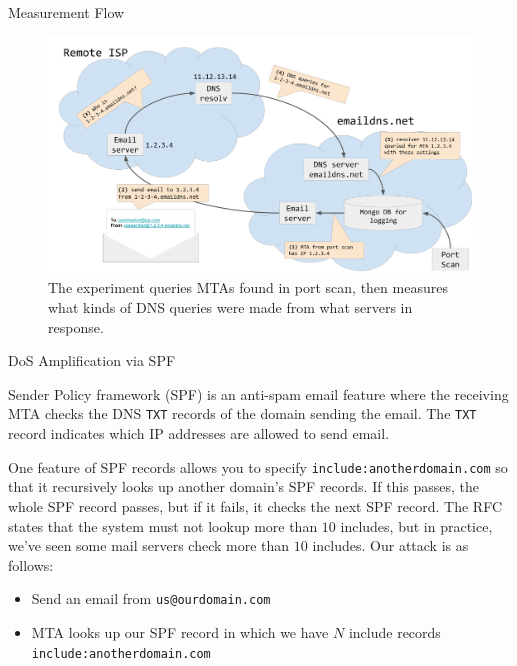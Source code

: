 \documentclass[final]{beamer}
\newlength{\onecolwid}
\newlength{\twocolwid}
\begin{document}
\begin{frame}[t]
\begin{columns}[t]
\begin{column}{\twocolwid}
\begin{columns}[t,totalwidth=\twocolwid]
\begin{column}{\onecolwid}
\begin{block}{Measurement Flow}
\begin{figure}[experiment]
  \centering
  \includegraphics[width=\onecolwid]{experiment_flow}
  \caption{The experiment queries MTAs found in port scan, then measures what kinds of DNS queries were made from what servers in response.}
\end{figure}

\end{block}


\begin{block}{DoS Amplification via SPF}


Sender Policy framework (SPF) is an anti-spam email feature where the receiving MTA checks the DNS {\tt TXT} records of the domain sending the email. The {\tt TXT} record indicates which IP addresses are allowed to send email. 

One feature of SPF records allows you to specify {\tt include:anotherdomain.com} so that it recursively looks up another domain's SPF records. If this passes, the whole SPF record passes, but if it fails, it checks the next SPF record. The RFC states that the system must not lookup more than $10$ includes, but in practice, we've seen some mail servers check more than $10$ includes. Our attack is as follows:
\begin{itemize}
\item Send an email from {\tt us@ourdomain.com}
\item MTA looks up our SPF record in which we have $N$ include records {\tt include:anotherdomain.com}
\end{itemize}


\end{block}
\end{column}
\end{columns}
\end{column}
\end{columns}
\end{frame}
\end{document}
